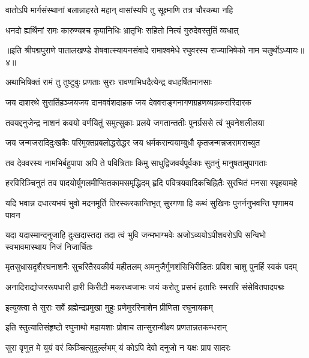 \twolineshloka
{वातोऽपि मार्गसंस्थानां बलान्नाहरते महान्}
{वासांस्यपि तु सूक्ष्माणि तत्र चौरकथा नहि}%

\twolineshloka
{धनदो ह्यर्थिनां रामः कारुण्यश्च कृपानिधिः}
{भ्रातृभिः सहितो नित्यं गुरुदेवस्तुतिं व्यधात्}%

{॥इति श्रीपद्मपुराणे पातालखण्डे शेषवात्स्यायनसंवादे रामाश्वमेधे रघुवरस्य राज्याभिषेको नाम चतुर्थोऽध्यायः॥४॥}



\twolineshloka
{अथाभिषिक्तं रामं तु तुष्टुवुः प्रणताः सुराः}
{रावणाभिधदैत्येन्द्र वधहर्षितमानसाः}%


\twolineshloka
{जय दाशरथे सुरार्तिहञ्जयजय दानववंशदाहक}
{जय देववराङ्गनागणग्रहणव्यग्रकरारिदारक}%

\twolineshloka
{तवयद्दनुजेन्द्र नाशनं कवयो वर्णयितुं समुत्सुकाः}
{प्रलये जगतान्ततीः पुनर्ग्रससे त्वं भुवनेशलीलया}%

\twolineshloka
{जय जन्मजरादिदुःखकैः परिमुक्तप्रबलोद्धरोद्धर}
{जय धर्मकरान्वयाम्बुधौ कृतजन्मन्नजरामराच्युत}%

\twolineshloka
{तव देववरस्य नामभिर्बहुपापा अपि ते पवित्रिताः}
{किमु साधुद्विजवर्यपूर्वकाः सुतनुं मानुषतामुपागताः}%

\twolineshloka
{हरविरिञ्चिनुतं तव पादयोर्युगलमीप्सितकामसमृद्धिदम्}
{हृदि पवित्रयवादिकचिह्नितैः सुरचितं मनसा स्पृहयामहे}%

\twolineshloka
{यदि भवान्न दधात्यभयं भुवो मदनमूर्ति तिरस्करकान्तिभृत्}
{सुरगणा हि कथं सुखिनः पुनर्ननुभवन्ति घृणामय पावन}%

\twolineshloka
{यदा यदास्मान्दनुजाहि दुःखदास्तदा तदा त्वं भुवि जन्मभाग्भवेः}
{अजोऽव्ययोऽपीशवरोऽपि सन्विभो स्वभावमास्थाय निजं निजार्चितः}%

\twolineshloka
{मृतसुधासदृशैरघनाशनैः सुचरितैरवकीर्य महीतलम्}
{अमनुजैर्गुणशंसिभिरीडितः प्रविश चाशु पुनर्हि स्वकं पदम्}%

\twolineshloka
{अनादिराद्योजररूपधारी हारी किरीटी मकरध्वजाभः}
{जयं करोतु प्रसभं हतारिः स्मरारि संसेवितपादपद्मः}%

\twolineshloka
{इत्युक्त्वा ते सुराः सर्वे ब्रह्मेन्द्रप्रमुखा मुहुः}
{प्रणेमुररिनाशेन प्रीणिता रघुनायकम्}%

\twolineshloka
{इति स्तुत्यातिसंहृष्टो रघुनाथो महायशाः}
{प्रोवाच तान्सुरान्वीक्ष्य प्रणतान्नतकन्धरान्}%


\twolineshloka
{सुरा वृणुत मे यूयं वरं किञ्चित्सुदुर्ल्लभम्}
{यं कोऽपि देवो दनुजो न यक्षः प्राप सादरः}%

